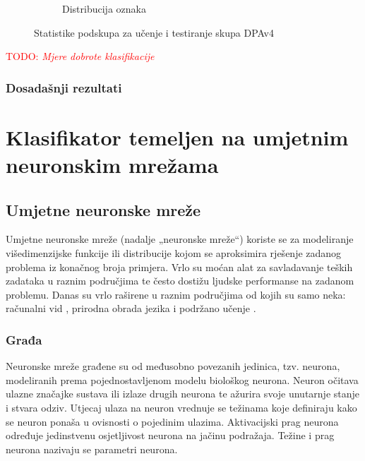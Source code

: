 \documentclass[times, utf8, numeric, diplomski]{fer}
\def\TODO#1{\noindent\textcolor{red}{TODO: \textit{#1}}\newline}
\def\todo#1{\TODO{#1}}
\begin{document}
\begin{figure}[H]
\begin{subfigure}{.5\textwidth}
\centering
\caption{Distribucija oznaka}
\label{fig:dpa4_test_outputs}
\end{subfigure}
\caption{Statistike podskupa za učenje i testiranje skupa DPAv4}
\end{figure}

\todo{Mjere dobrote klasifikacije}

\subsection{Dosadašnji rezultati}


\chapter{Klasifikator temeljen na umjetnim neuronskim mrežama}

\section{Umjetne neuronske mreže}
Umjetne neuronske mreže (nadalje „neuronske mreže“) koriste se za modeliranje višedimenzijske funkcije ili distribucije kojom se aproksimira rješenje zadanog problema iz konačnog broja primjera. Vrlo su moćan alat za savladavanje teških zadataka u raznim područjima te često dostižu ljudske performanse na zadanom problemu. Danas su vrlo raširene u raznim područjima od kojih su samo neka: računalni vid \citep{alexnet,yolo}, prirodna obrada jezika \citep{word2vec,char_cnn} i podržano učenje \citep{atari,active_learn}.

\subsection{Građa}
Neuronske mreže građene su od međusobno povezanih jedinica, tzv. neurona, modeliranih prema pojednostavljenom modelu biološkog neurona. Neuron očitava ulazne značajke sustava ili izlaze drugih neurona te ažurira svoje unutarnje stanje i stvara odziv. Utjecaj ulaza na neuron vrednuje se težinama  koje definiraju kako se neuron ponaša u ovisnosti o pojedinim ulazima. Aktivacijski prag neurona  određuje jedinstvenu osjetljivost neurona na jačinu podražaja. Težine i prag neurona nazivaju se parametri neurona.
\end{document}

